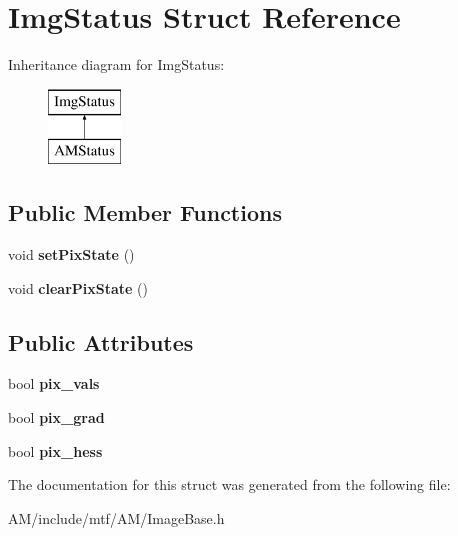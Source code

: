 \hypertarget{structImgStatus}{\section{Img\-Status Struct Reference}
\label{structImgStatus}
}
Inheritance diagram for Img\-Status\-:\begin{figure}[H]
\begin{center}
\leavevmode
\includegraphics[height=2.000000cm]{structImgStatus}
\end{center}
\end{figure}
\subsection*{Public Member Functions}
\begin{DoxyCompactItemize}
\item 
\hypertarget{structImgStatus_a613cf6ca781d5bf8ffbc429bf7e56ec3}{void {\bfseries set\-Pix\-State} ()}\label{structImgStatus_a613cf6ca781d5bf8ffbc429bf7e56ec3}

\item 
\hypertarget{structImgStatus_adf986a18f22cd34178ac097ab2cb32e2}{void {\bfseries clear\-Pix\-State} ()}\label{structImgStatus_adf986a18f22cd34178ac097ab2cb32e2}

\end{DoxyCompactItemize}
\subsection*{Public Attributes}
\begin{DoxyCompactItemize}
\item 
\hypertarget{structImgStatus_a82dadcad1833463681aa1b3613f317a6}{bool {\bfseries pix\-\_\-vals}}\label{structImgStatus_a82dadcad1833463681aa1b3613f317a6}

\item 
\hypertarget{structImgStatus_a19bdab5df0acba90aee60d8bf7f48896}{bool {\bfseries pix\-\_\-grad}}\label{structImgStatus_a19bdab5df0acba90aee60d8bf7f48896}

\item 
\hypertarget{structImgStatus_a5ad02dd50c054d6a72c5a3010858cbde}{bool {\bfseries pix\-\_\-hess}}\label{structImgStatus_a5ad02dd50c054d6a72c5a3010858cbde}

\end{DoxyCompactItemize}


The documentation for this struct was generated from the following file\-:\begin{DoxyCompactItemize}
\item 
A\-M/include/mtf/\-A\-M/Image\-Base.\-h\end{DoxyCompactItemize}
